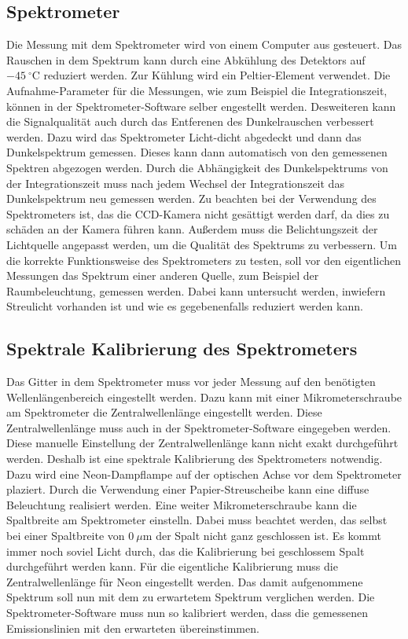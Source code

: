 \subsection{Spektrometer}
Die Messung mit dem Spektrometer wird von einem Computer aus gesteuert. Das Rauschen in dem Spektrum kann durch eine Abkühlung des Detektors auf $-45\ {}^\circ\mathrm{C}$ reduziert werden. Zur Kühlung wird ein Peltier-Element verwendet. 
Die Aufnahme-Parameter für die Messungen, wie zum Beispiel die Integrationszeit, können in der Spektrometer-Software selber engestellt werden. 
Desweiteren kann die Signalqualität auch durch das Entferenen des Dunkelrauschen verbessert werden. 
Dazu wird das Spektrometer Licht-dicht abgedeckt und dann das Dunkelspektrum gemessen. 
Dieses kann dann automatisch von den gemessenen Spektren abgezogen werden. 
Durch die Abhängigkeit des Dunkelspektrums von der Integrationszeit muss nach jedem Wechsel der Integrationszeit das Dunkelspektrum neu gemessen werden. 
Zu beachten bei der Verwendung des Spektrometers ist, das die CCD-Kamera nicht gesättigt werden darf, da dies zu schäden an der Kamera führen kann. 
Au{\ss}erdem muss die Belichtungszeit der Lichtquelle angepasst werden, um die Qualität des Spektrums zu verbessern. 
Um die korrekte Funktionsweise des Spektrometers zu testen, soll vor den eigentlichen Messungen das Spektrum einer anderen Quelle, zum Beispiel der Raumbeleuchtung, gemessen werden. 
Dabei kann untersucht werden, inwiefern Streulicht vorhanden ist und wie es gegebenenfalls reduziert werden kann. 
\subsection{Spektrale Kalibrierung des Spektrometers}
\label{sec:Kalibrierung}
Das Gitter in dem Spektrometer muss vor jeder Messung auf den benötigten Wellenlängenbereich eingestellt werden. 
Dazu kann mit einer Mikrometerschraube am Spektrometer die Zentralwellenlänge eingestellt werden. 
Diese Zentralwellenlänge muss auch in der Spektrometer-Software eingegeben werden. 
Diese manuelle Einstellung der Zentralwellenlänge kann nicht exakt durchgeführt werden. 
Deshalb ist eine spektrale Kalibrierung des Spektrometers notwendig.
Dazu wird eine Neon-Dampflampe auf der optischen Achse vor dem Spektrometer plaziert. Durch die Verwendung einer Papier-Streuscheibe kann eine diffuse Beleuchtung realisiert werden.
Eine weiter Mikrometerschraube kann die Spaltbreite am Spektrometer einstelln. Dabei muss beachtet werden, das selbst bei einer  Spaltbreite von $0\ \mu$m der Spalt nicht ganz geschlossen ist. 
Es kommt immer noch soviel Licht durch, das die Kalibrierung bei geschlossem Spalt durchgeführt werden kann.
Für die eigentliche Kalibrierung muss die Zentralwellenlänge für Neon eingestellt werden. 
Das damit aufgenommene Spektrum soll nun mit dem zu erwartetem Spektrum verglichen werden. 
Die Spektrometer-Software muss nun so kalibriert werden, dass die gemessenen Emissionslinien mit den erwarteten übereinstimmen. 
